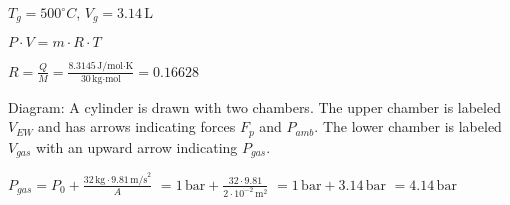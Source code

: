 \( T_g = 500^\circ C \), \( V_g = 3.14 \, \text{L} \)  

\( P \cdot V = m \cdot R \cdot T \)  

\( R = \frac{Q}{M} = \frac{8.3145 \, \text{J/mol·K}}{30 \, \text{kg·mol}} = 0.16628 \)  

Diagram:  
A cylinder is drawn with two chambers. The upper chamber is labeled \( V_{EW} \) and has arrows indicating forces \( F_p \) and \( P_{amb} \). The lower chamber is labeled \( V_{gas} \) with an upward arrow indicating \( P_{gas} \).  

\( P_{gas} = P_0 + \frac{32 \, \text{kg} \cdot 9.81 \, \text{m/s}^2}{A} \)  
\( = 1 \, \text{bar} + \frac{32 \cdot 9.81}{2 \cdot 10^{-2} \, \text{m}^2} \)  
\( = 1 \, \text{bar} + 3.14 \, \text{bar} \)  
\( = 4.14 \, \text{bar} \)